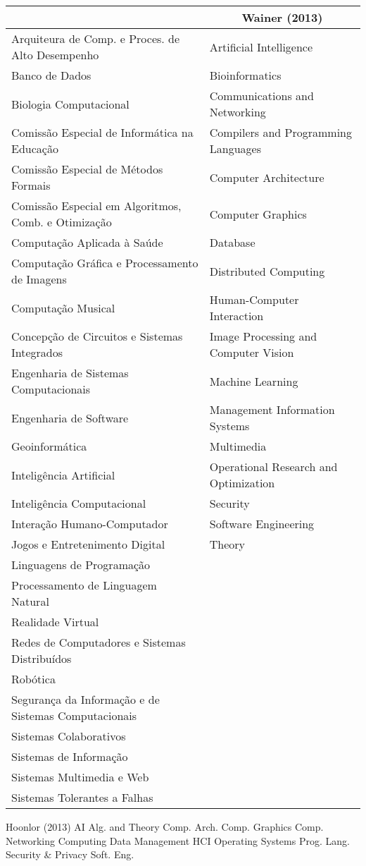 \begin{table}[htbp]
\centering
\begin{tabular}{ll}
\scriptsize
\toprule
\multicolumn{1}{c}{SBC (2016)}						&	\multicolumn{1}{c}{Wainer (2013)}		\\								
\midrule
Arquiteura de Comp. e Proces. de Alto Desempenho	&	Artificial Intelligence					\\
Banco de Dados										&	Bioinformatics							\\
Biologia Computacional 								&	Communications and Networking			\\
Comissão Especial de Informática na Educação		&	Compilers and Programming Languages		\\
Comissão Especial de Métodos Formais				&	Computer Architecture					\\
Comissão Especial em Algoritmos, Comb. e Otimização	&	Computer Graphics						\\
Computação Aplicada à Saúde							&	Database								\\
Computação Gráfica e Processamento de Imagens		&	Distributed Computing					\\
Computação Musical 									&	Human-Computer Interaction				\\
Concepção de Circuitos e Sistemas Integrados 		&	Image Processing and Computer Vision	\\
Engenharia de Sistemas Computacionais				&	Machine Learning						\\
Engenharia de Software								&	Management Information Systems			\\
Geoinformática										&	Multimedia								\\
Inteligência Artificial								&	Operational Research and Optimization	\\
Inteligência Computacional 							&	Security								\\
Interação Humano-Computador							&	Software Engineering					\\
Jogos e Entretenimento Digital 						&	Theory									\\
Linguagens de Programação							&											\\
Processamento de Linguagem Natural					&											\\
Realidade Virtual									&											\\
Redes de Computadores e Sistemas Distribuídos		&											\\
Robótica 											&											\\
Segurança da Informação e de Sistemas Computacionais&	 										\\
Sistemas Colaborativos								&											\\
Sistemas de Informação								&											\\
Sistemas Multimedia e Web							&											\\
Sistemas Tolerantes a Falhas 						&											\\
\bottomrule
\end{tabular}
\end{table}


Hoonlor (2013)
AI
Alg. and Theory
Comp. Arch.
Comp. Graphics
Comp. Networking
Computing
Data Management
HCI
Operating Systems
Prog. Lang.
Security & Privacy
Soft. Eng.